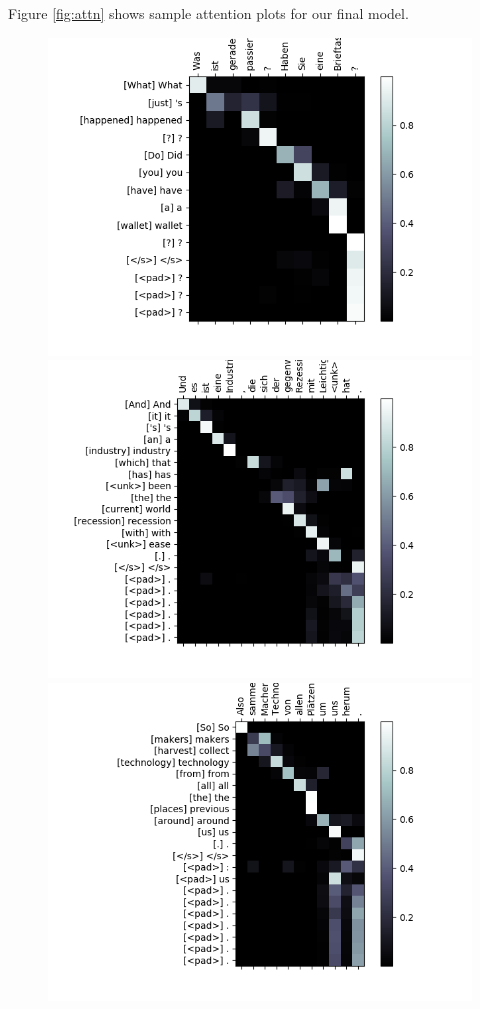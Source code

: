 \documentclass[11pt]{article}
\begin{document}
Figure \ref{fig:attn} shows sample attention plots for our final model.

\begin{figure}[H]
	\begin{center}
		\includegraphics[scale=0.5]{attn_0}
		\includegraphics[scale=0.5]{attn_1}
		\includegraphics[scale=0.5]{attn_2}

\end{center}
\end{figure}
\end{document}
